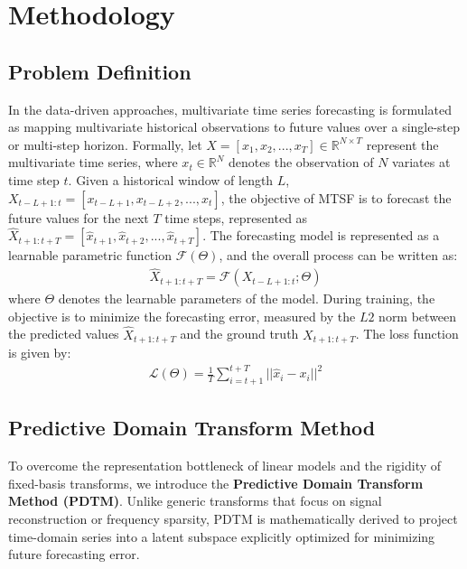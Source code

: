 \documentclass[final,3p,times]{elsarticle}
\begin{document}
\section{Methodology}

\subsection{Problem Definition}

In the data-driven approaches, multivariate time series forecasting is formulated as mapping multivariate historical observations to future values over a single-step or multi-step horizon. Formally, let $X=[x_1,x_2,...,x_T]\in \mathbb{R}^{N \times T}$ represent the multivariate time series, where $x_t \in \mathbb{R}^N$ denotes the observation of $N$ variates at time step $t$. Given a historical window of length $L$, $X_{t-L+1:t}=[x_{t-L+1},x_{t-L+2},...,x_{t}]$, the objective of MTSF is to forecast the future values for the next $T$ time steps, represented as $\hat{X}_{t+1:t+T} = [\hat{x}_{t+1},\hat{x}_{t+2},...,\hat{x}_{t+T}]$. The forecasting model is represented as a learnable parametric function $\mathcal{F}(\Theta)$, and the overall process can be written as:
\begin{align}
\label{eqn_fore}
\hat{X}_{t+1:t+T}=\mathcal{F}(X_{t-L+1:t};\Theta)
\end{align}
where $\Theta$ denotes the learnable parameters of the model. During training, the objective is to minimize the forecasting error, measured by the $L2$ norm between the predicted values $\hat{X}_{t+1:t+T}$ and the ground truth $X_{t+1:t+T}$. The loss function is given by:
\begin{align}
\label{eqn_foreloss}
\mathcal{L}(\Theta)=\frac{1}{T}\sum_{i=t+1}^{t+T}{||\hat{x}_i-x_i||^2}
\end{align}


\subsection{Predictive Domain Transform Method}
\label{sec:pdt}

To overcome the representation bottleneck of linear models and the rigidity of fixed-basis transforms, we introduce the \textbf{Predictive Domain Transform Method (PDTM)}. Unlike generic transforms that focus on signal reconstruction or frequency sparsity, PDTM is mathematically derived to project time-domain series into a latent subspace explicitly optimized for minimizing future forecasting error.
\end{document}
